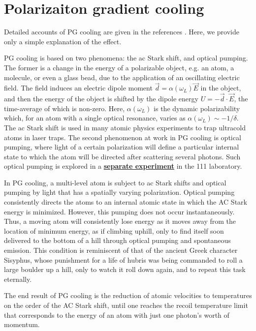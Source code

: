 \documentclass{../lab}
\begin{document}
\appendix

\section{Polarizaiton gradient cooling}
\label{sec:pgcooling}

Detailed accounts of PG cooling are given in the references \cite{Metcalf}. Here, we provide only a simple explanation of the effect.

PG cooling is based on two phenomena: the ac Stark shift, and optical pumping. The former is a change in the energy of a polarizable object, e.g. an atom, a molecule, or even a glass bead, due to the application of an oscillating electric field. The field induces an electric dipole moment $\vec{d} = \alpha(\omega_L)\vec{E}$ in the object, and then the energy of the object is shifted by the dipole energy $ U = -\vec{d}\cdot \vec{E}$, the time-average of which is non-zero. Here, $\alpha(\omega_L)$ is the dynamic polarizability which, for an atom with a single optical resonance, varies as $\alpha(\omega_L) \sim -1/\delta$. The ac Stark shift is used in many atomic physics experiments to trap ultracold atoms in laser traps. The second phenomenon at work in PG cooling is optical pumping, where light of a certain polarization will define a particular internal state to which the atom will be directed after scattering several photons. Such optical pumping is explored in a \href{http://experimentationlab.berkeley.edu/OPT}{\textbf{separate experiment}} in the 111 laboratory.

In PG cooling, a multi-level atom is subject to ac Stark shifts and optical pumping by light that has a spatially varying polarization. Optical pumping consistently directs the atoms to an internal atomic state in which the AC Stark energy is minimized. However, this pumping does not occur instantaneously. Thus, a moving atom will consistently lose energy as it moves away from the location of minimum energy, as if climbing uphill, only to find itself soon delivered to the bottom of a hill through optical pumping and spontaneous emission. This condition is reminiscent of that of the ancient Greek character Sisyphus, whose punishment for a life of hubris was being commanded to roll a large boulder up a hill, only to watch it roll down again, and to repeat this task eternally.

The end result of PG cooling is the reduction of atomic velocities to temperatures on the order of the AC Stark shift, until one reaches the recoil temperature limit that corresponds to the energy of an atom with just one photon's worth of momentum.
\end{document}
